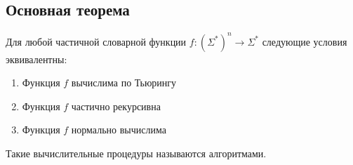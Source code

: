 \subsection*{Основная теорема}
Для любой частичной словарной функции $f:(\Sigma^*)^n\rightarrow\Sigma^*$ следующие условия эквивалентны:
\begin{enumerate}
    \item Функция $f$ вычислима по Тьюрингу
    \item Функция $f$ частично рекурсивна
    \item Функция $f$ нормально вычислима
\end{enumerate}
Такие вычислительные процедуры называются алгоритмами.